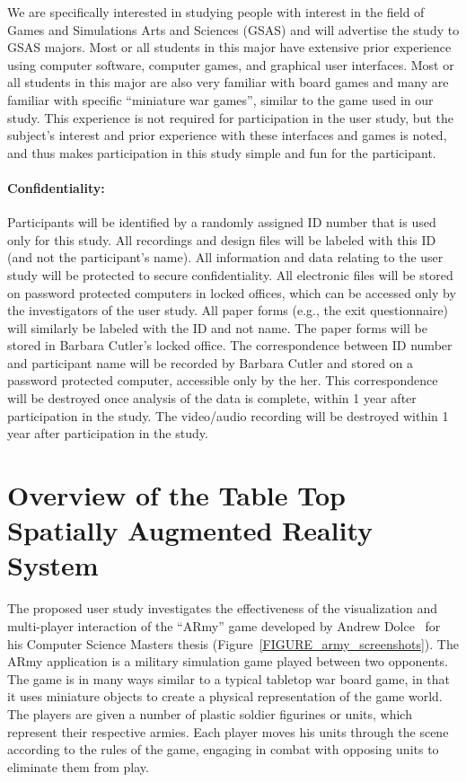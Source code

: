 \documentclass[10pt]{article}
\begin{document}
We are specifically interested in studying people with interest in the
field of Games and Simulations Arts and Sciences (GSAS) and will
advertise the study to GSAS majors.  Most or all students in this
major have extensive prior experience using computer software,
computer games, and graphical user interfaces.  Most or all students
in this major are also very familiar with board games and many are
familiar with specific ``miniature war games'', similar to the game
used in our study.  This experience is not required for participation
in the user study, but the subject's interest and prior experience
with these interfaces and games is noted, and thus makes participation
in this study simple and fun for the participant.  


\paragraph{Confidentiality:}
Participants will be identified by a randomly assigned ID number that
is used only for this study.  All recordings and design files will be
labeled with this ID (and not the participant's name).  All
information and data relating to the user study will be protected to
secure confidentiality.  All electronic files will be stored on
password protected computers in locked offices, which can be accessed
only by the investigators of the user study.  All paper forms (e.g.,
the exit questionnaire) will similarly be labeled with the ID and not
name.  The paper forms will be stored in Barbara Cutler's locked
office.  The correspondence between ID number and participant name
will be recorded by Barbara Cutler and stored on a password protected
computer, accessible only by the her.  This correspondence will be
destroyed once analysis of the data is complete, within 1 year after
participation in the study.  The video/audio recording will be
destroyed within 1 year after participation in the study.

\newpage

\section{Overview of the Table Top Spatially Augmented Reality System}

\noindent
The proposed user study investigates the effectiveness of the
visualization and multi-player interaction of the ``ARmy'' game
developed by Andrew Dolce~\cite{dolce} for his Computer Science
Masters thesis (Figure~\ref{FIGURE_army_screenshots}). The ARmy
application is a military simulation game played between two
opponents. The game is in many ways similar to a typical tabletop war
board game, in that it uses miniature objects to create a physical
representation of the game world. The players are given a number of
plastic soldier figurines or units, which represent their respective
armies. Each player moves his units through the scene according to the
rules of the game, engaging in combat with opposing units to eliminate
them from play.
\end{document}

